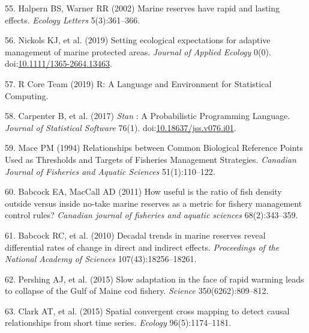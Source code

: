 \documentclass[9pt,twocolumn,twoside,lineno]{pnas-new}
\begin{document}
\leavevmode\hypertarget{ref-halpern2002}{}%
55. Halpern BS, Warner RR (2002) Marine reserves have rapid and lasting
effects. \emph{Ecology Letters} 5(3):361--366.

\leavevmode\hypertarget{ref-nickols2019}{}%
56. Nickols KJ, et al. (2019) Setting ecological expectations for
adaptive management of marine protected areas. \emph{Journal of Applied
Ecology} 0(0).
doi:\href{https://doi.org/10.1111/1365-2664.13463}{10.1111/1365-2664.13463}.

\leavevmode\hypertarget{ref-rcoreteam2019}{}%
57. R Core Team (2019) R: A Language and Environment for Statistical
Computing.

\leavevmode\hypertarget{ref-carpenter2017}{}%
58. Carpenter B, et al. (2017) \emph{Stan} : A Probabilistic Programming
Language. \emph{Journal of Statistical Software} 76(1).
doi:\href{https://doi.org/10.18637/jss.v076.i01}{10.18637/jss.v076.i01}.

\leavevmode\hypertarget{ref-mace1994}{}%
59. Mace PM (1994) Relationships between Common Biological Reference
Points Used as Thresholds and Targets of Fisheries Management
Strategies. \emph{Canadian Journal of Fisheries and Aquatic Sciences}
51(1):110--122.

\leavevmode\hypertarget{ref-babcock2011}{}%
60. Babcock EA, MacCall AD (2011) How useful is the ratio of fish
density outside versus inside no-take marine reserves as a metric for
fishery management control rules? \emph{Canadian journal of fisheries
and aquatic sciences} 68(2):343--359.

\leavevmode\hypertarget{ref-babcock2010}{}%
61. Babcock RC, et al. (2010) Decadal trends in marine reserves reveal
differential rates of change in direct and indirect effects.
\emph{Proceedings of the National Academy of Sciences}
107(43):18256--18261.

\leavevmode\hypertarget{ref-pershing2015a}{}%
62. Pershing AJ, et al. (2015) Slow adaptation in the face of rapid
warming leads to collapse of the Gulf of Maine cod fishery.
\emph{Science} 350(6262):809--812.

\leavevmode\hypertarget{ref-clark2015}{}%
63. Clark AT, et al. (2015) Spatial convergent cross mapping to detect
causal relationships from short time series. \emph{Ecology}
96(5):1174--1181.



% 
\end{document}

